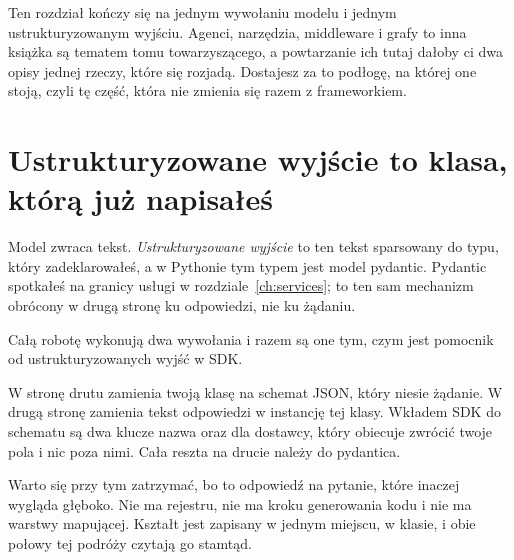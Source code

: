 Ten rozdział kończy się na jednym wywołaniu modelu i jednym ustrukturyzowanym
wyjściu. Agenci, narzędzia, middleware i grafy to inna książka \dash{} są
tematem tomu towarzyszącego, a powtarzanie ich tutaj dałoby ci dwa opisy
jednej rzeczy, które się rozjadą. Dostajesz za to podłogę, na której one
stoją, czyli tę część, która nie zmienia się razem z frameworkiem.

\section{Ustrukturyzowane wyjście to klasa, którą już napisałeś}
\label{sec:ai-structured}

Model zwraca tekst. \emph{Ustrukturyzowane wyjście} to ten tekst sparsowany
do typu, który zadeklarowałeś, a w Pythonie tym typem jest model pydantic.
Pydantic spotkałeś na granicy usługi w rozdziale~\ref{ch:services}; to ten
sam mechanizm obrócony w drugą stronę \dash{} ku odpowiedzi, nie ku żądaniu.


Całą robotę wykonują dwa wywołania i razem są one tym, czym jest pomocnik od
ustrukturyzowanych wyjść w SDK.



W stronę drutu  zamienia twoją klasę na schemat
JSON, który niesie żądanie. W drugą stronę
zamienia tekst odpowiedzi w instancję tej klasy. Wkładem SDK do schematu są
dwa klucze \dash{} nazwa oraz  dla
dostawcy, który obiecuje zwrócić twoje pola i nic poza nimi. Cała reszta na
drucie należy do pydantica.

Warto się przy tym zatrzymać, bo to odpowiedź na pytanie, które inaczej
wygląda głęboko. Nie ma rejestru, nie ma kroku generowania kodu i nie ma
warstwy mapującej. Kształt jest zapisany w jednym miejscu, w klasie, i obie
połowy tej podróży czytają go stamtąd.

